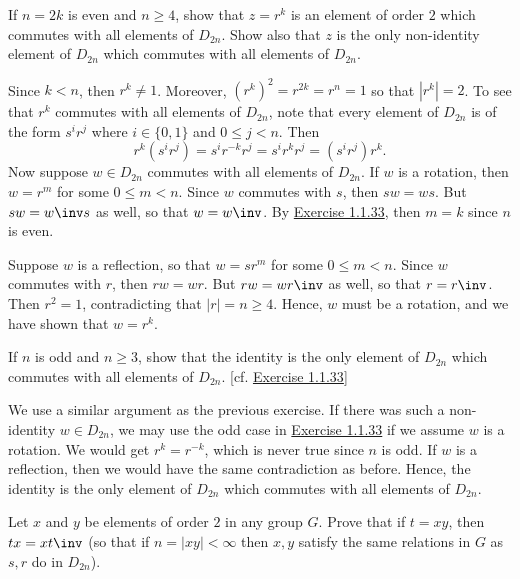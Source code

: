 \begin{exercise}\label{ex1.2.4}
    If $n = 2k$ is even and $n \ge 4$, show that $z = r^k$ is an element of order $2$ which commutes with all elements of $D_{2n}$. Show also that $z$ is the only non-identity element of $D_{2n}$ which commutes with all elements of $D_{2n}$.

\end{exercise}
   
\begin{sol}
    Since $k < n$, then $r^k \neq 1$. Moreover, $(r^k)^2 = r^{2k} = r^n = 1$ so that $|r^k| = 2$. To see that $r^k$ commutes with all elements of $D_{2n}$, note that every element of $D_{2n}$ is of the form $s^ir^j$ where $i \in \{0, 1\}$ and $0 \leq j < n$. Then
    \[r^k(s^ir^j) = s^ir^{-k}r^j = s^ir^kr^j = (s^ir^j)r^k.\]
    Now suppose $w \in D_{2n}$ commutes with all elements of $D_{2n}$. If $w$ is a rotation, then $w = r^m$ for some $0 \leq m < n$. Since $w$ commutes with $s$, then $sw = ws$. But $sw = w\inv s$ as well, so that $w = w\inv$. By \hyperref[ex1.1.33]{Exercise 1.1.33}, then $m = k$ since $n$ is even.

    Suppose $w$ is a reflection, so that $w = sr^m$ for some $0 \leq m < n$. Since $w$ commutes with $r$, then $rw = wr$. But $rw = w r\inv$ as well, so that $r = r\inv$. Then $r^2 = 1$, contradicting that $|r| = n \geq 4$. Hence, $w$ must be a rotation, and we have shown that $w = r^k$.
\end{sol}

\begin{exercise}\label{ex1.2.5}
    If $n$ is odd and $n \geq 3$, show that the identity is the only element of $D_{2n}$ which commutes with all elements of $D_{2n}$. [cf. \hyperref[ex1.1.33]{Exercise 1.1.33}]
\end{exercise}

\begin{sol}
    We use a similar argument as the previous exercise. If there was such a non-identity $w \in D_{2n}$, we may use the odd case in \hyperref[ex1.1.33]{Exercise 1.1.33} if we assume $w$ is a rotation. We would get $r^k = r^{-k}$, which is never true since $n$ is odd. If $w$ is a reflection, then we would have the same contradiction as before. Hence, the identity is the only element of $D_{2n}$ which commutes with all elements of $D_{2n}$.
\end{sol}

\begin{exercise}\label{ex1.2.6}
    Let $x$ and $y$ be elements of order $2$ in any group $G$. Prove that if $t = xy$, then $tx = xt\inv$ (so that if $n = |xy| < \infty$ then $x, y$ satisfy the same relations in $G$ as $s, r$ do in $D_{2n}$).
\end{exercise}

